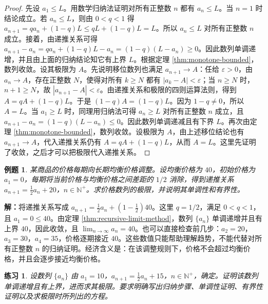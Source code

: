 \documentclass[UTF8,fontset=fandol,11pt]{ctexart}
\newtheorem{example}[definition]{例题}
\newtheorem{exercise}[definition]{练习}
\begin{document}
\begin{proof}
先设 $a_1\leq L$。用数学归纳法证明对所有正整数 $n$ 都有 $a_n\leq L$。当 $n=1$ 时结论成立。若 $a_n\leq L$，则由 $0<q<1$ 得 $a_{n+1}=q a_n+(1-q)L\leq qL+(1-q)L=L$。所以 $a_n\leq L$ 对所有正整数 $n$ 成立。接着，由递推关系可得 $a_{n+1}-a_n=q a_n+(1-q)L-a_n=(1-q)(L-a_n)\geq0$。因此数列单调递增，并且由上面的归纳结论知它有上界 $L$。根据定理 \ref{thm:monotone-bounded}，数列收敛。设其极限为 $A$。先说明移位数列也满足 $a_{n+1}\to A$：任给 $\varepsilon>0$，由 $a_n\to A$，存在正整数 $N$，使得对所有 $k\geq N$ 都有 $|a_k-A|<\varepsilon$；当 $n\geq N$ 时，$n+1\geq N$，故 $|a_{n+1}-A|<\varepsilon$。由递推关系和极限的四则运算法则，得到 $A=qA+(1-q)L$。于是 $(1-q)A=(1-q)L$。因为 $1-q\neq0$，所以 $A=L$。当 $a_1\geq L$ 时，同理用归纳法可得 $a_n\geq L$ 对所有正整数 $n$ 成立，且 $a_{n+1}-a_n=(1-q)(L-a_n)\leq0$。因此数列单调递减且有下界 $L$。再次由定理 \ref{thm:monotone-bounded}，数列收敛。设极限为 $A$，由上述移位结论也有 $a_{n+1}\to A$，代入递推关系仍有 $A=qA+(1-q)L$，从而 $A=L$。这里先证明了收敛，之后才可以把极限代入递推关系。
\end{proof}
\begin{example}
某商品的价格每期向长期均衡价格调整。设均衡价格为 $40$，初始价格为 $a_1=0$，每期将当前价格与均衡价格之间差距的 $1/2$ 消除，得到递推关系 $a_{n+1}=\frac12a_n+20$，$n\in\mathbb{N}^{+}$。求价格数列的极限，并说明其单调性和有界性。
\end{example}
\par\noindent\textbf{解：}将递推关系写成 $a_{n+1}=\frac12a_n+\left(1-\frac12\right)40$。这里 $q=1/2$，满足 $0<q<1$，且 $a_1=0\leq40$。由定理 \ref{thm:recursive-limit-method}，数列 $\{a_n\}$ 单调递增并且有上界 $40$，因此收敛，且 $\lim_{n\to\infty}a_n=40$。也可以直接检查前几步：$a_2=20$，$a_3=30$，$a_4=35$，价格逐期接近 $40$。这些数值只能帮助理解趋势，不能代替对所有正整数 $n$ 的归纳证明。经济含义是：在该调整规则下，价格不会超过均衡价格，并且会逐步接近均衡价格。\par
\begin{exercise}
\label{mathagent:exercise:3095db2dc0f723686b84b8afdd22af197f8af13ce063f1be09f10d01d7c714d4}
设数列 $\{a_n\}$ 由 $a_1=10$，$a_{n+1}=\frac12a_n+15$，$n\in\mathbb{N}^{+}$，确定。证明该数列单调递增且有上界，进而求其极限。要求明确写出归纳步骤、单调性证明、有界性证明以及求极限时所列出的方程。
\end{exercise}
\end{document}
